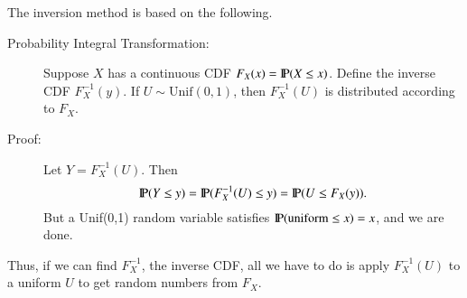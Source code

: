 \documentclass[captions=tableheading]{scrbook}
\begin{document}
The inversion method is based on the following.


\begin{description}
\item[Probability Integral Transformation:] Suppose \(X\) has a continuous CDF $F_{X}(x)=\P(X \leq x)$. Define the inverse CDF $F_{X}^{-1}(y)$.  If $U\sim\mathrm{Unif}(0,1)$, then $F_{X}^{-1}(U)$ is distributed according to $F_{X}$.
\item[Proof:] Let \(Y = F_{X}^{-1}(U)\). Then 
  \[
  \P(Y \leq y)=\P(F_{X}^{-1}(U)\leq y)=\P(U\leq F_{X}(y)).
  \]
  But a Unif(0,1) random variable satisfies $\P(\mbox{uniform}\leq x) = x$, and we are done.
\end{description}

Thus, if we can find $F_{X}^{-1}$, the inverse CDF, all we have to do is apply $F_{X}^{-1}(U)$ to a uniform $U$ to get random numbers from $F_{X}$.
\end{document}
